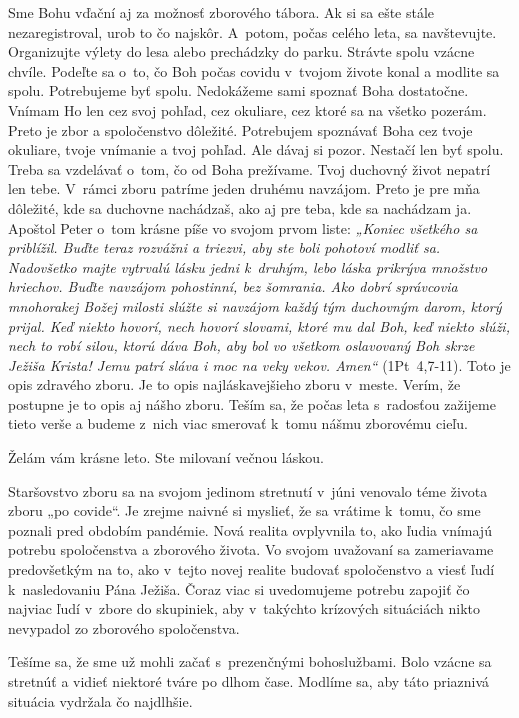 Sme Bohu vďační aj za možnosť zborového tábora. Ak si sa ešte stále nezaregistroval, urob to čo najskôr. A~potom, počas celého leta, sa navštevujte. Organizujte výlety  do lesa alebo prechádzky do parku. Strávte spolu vzácne chvíle. Podeľte sa o~to, čo Boh počas covidu v~tvojom živote konal a modlite sa spolu. Potrebujeme byť spolu. Nedokážeme sami spoznať Boha dostatočne. Vnímam Ho len cez svoj pohľad, cez okuliare, cez ktoré sa na všetko pozerám. Preto je zbor a spoločenstvo dôležité. Potrebujem spoznávať Boha cez tvoje okuliare, tvoje vnímanie a tvoj pohľad. Ale dávaj si pozor. Nestačí len byť spolu. Treba sa vzdelávať o~tom, čo od Boha prežívame. Tvoj duchovný život nepatrí len tebe. V~rámci zboru patríme jeden druhému navzájom. Preto je pre mňa dôležité, kde sa duchovne nachádzaš, ako aj pre teba, kde sa nachádzam ja. Apoštol Peter o~tom krásne píše vo svojom prvom liste: {\it „Koniec všetkého sa priblížil. Buďte teraz rozvážni a triezvi, aby ste boli pohotoví modliť sa.  Nadovšetko majte vytrvalú lásku jedni k~druhým, lebo láska prikrýva množstvo hriechov. Buďte navzájom pohostinní, bez šomrania. Ako dobrí správcovia mnohorakej Božej milosti slúžte si navzájom každý tým duchovným darom, ktorý prijal. Keď niekto hovorí, nech hovorí slovami, ktoré mu dal Boh, keď niekto slúži, nech to robí silou, ktorú dáva Boh, aby bol vo všetkom oslavovaný Boh skrze Ježiša Krista! Jemu patrí sláva i moc na veky vekov. Amen“} (1Pt~4,7-11). Toto je opis zdravého zboru. Je to opis najláskavejšieho zboru v~meste. Verím, že postupne je to opis aj nášho zboru. Teším sa, že počas leta s~radosťou zažijeme tieto verše a budeme z~nich viac smerovať k~tomu nášmu zborovému cieľu.

Želám vám krásne leto. Ste milovaní večnou láskou.



Staršovstvo zboru sa na svojom jedinom stretnutí v~júni venovalo téme života zboru „po covide“. Je zrejme naivné si myslieť, že sa vrátime k~tomu, čo sme poznali pred obdobím pandémie. Nová realita ovplyvnila to, ako ľudia vnímajú potrebu spoločenstva a zborového života. Vo svojom uvažovaní sa zameriavame predovšetkým na to, ako v~tejto novej realite budovať spoločenstvo a viesť ľudí k~nasledovaniu Pána Ježiša. Čoraz viac si uvedomujeme potrebu zapojiť čo najviac ľudí v~zbore do skupiniek, aby v~takýchto krízových situáciách nikto nevypadol zo zborového spoločenstva.

Tešíme sa, že sme už mohli začať s~prezenčnými bohoslužbami. Bolo vzácne sa stretnúť a vidieť niektoré tváre po dlhom čase. Modlíme sa, aby táto priaznivá situácia vydržala čo najdlhšie.

